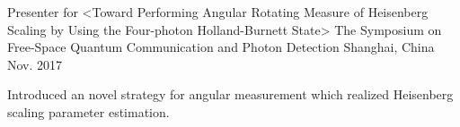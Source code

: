 \begin{cventries}
  \cventry
    {Presenter for <Toward Performing Angular Rotating Measure of Heisenberg Scaling by Using the Four-photon Holland-Burnett State>}
    {The Symposium on Free-Space Quantum Communication and Photon Detection}
    {Shanghai, China}
    {Nov. 2017}
    {
      \begin{cvitems} %
        \item {Introduced an novel strategy for angular measurement which realized Heisenberg scaling parameter estimation.}
      \end{cvitems}
    }
\end{cventries}
